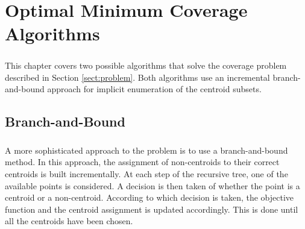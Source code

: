 \chapter{Optimal Minimum Coverage Algorithms}
\label{chap:algos}
\paragraph{}
This chapter covers two possible algorithms that solve the coverage problem described in Section \ref{sect:problem}. Both algorithms use an incremental branch-and-bound approach for implicit enumeration of the centroid subsets.\\

\section{Branch-and-Bound}
\label{alg:bb}
\paragraph{}
A more sophisticated approach to the problem is to use a branch-and-bound method.
In this approach, the assignment of non-centroids to their correct centroids is built incrementally.
At each step of the recursive tree, one of the available points is considered. A decision is then taken of whether the point is a centroid or a non-centroid. According to which decision is taken, the objective function and the centroid assignment is updated accordingly. This is done until all the centroids have been chosen.
